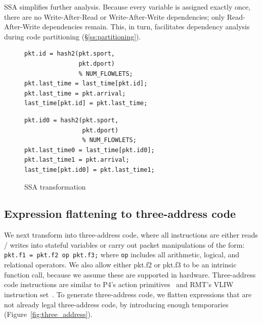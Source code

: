 SSA simplifies further analysis. Because every variable is assigned exactly
once, there are no Write-After-Read or Write-After-Write dependencies; only
Read-After-Write dependencies remain. This, in turn, facilitates dependency
analysis during code partitioning (\S\ref{ss:partitioning}).

\begin{figure}[!t]
  \begin{minipage}{0.48\textwidth}
  \begin{small}
  \begin{lstlisting}[style=customc]
pkt.id = hash2(pkt.sport,
               pkt.dport)
               % NUM_FLOWLETS;
pkt.last_time = last_time[pkt.id];
pkt.last_time = pkt.arrival;
last_time[pkt.id] = pkt.last_time;
  \end{lstlisting}
  \end{small}
  \end{minipage}
  \begin{minipage}{0.52\textwidth}
  \begin{small}
  \begin{lstlisting}[style=customc]
pkt.id0 = hash2(pkt.sport,
                pkt.dport)
                % NUM_FLOWLETS;
pkt.last_time0 = last_time[pkt.id0];
pkt.last_time1 = pkt.arrival;
last_time[pkt.id0] = pkt.last_time1;
  \end{lstlisting}
  \end{small}
  \end{minipage}
  \caption{SSA transformation}
\label{fig:ssa}
\end{figure}

\subsection{Expression flattening to three-address code}
We next transform into three-address code, where all instructions are either
reads / writes into stateful variables or carry out packet manipulations of the
form: \texttt{pkt.f1 = pkt.f2 op pkt.f3;} where \texttt{op} includes all
arithmetic, logical, and relational operators. We also allow either pkt.f2 or
pkt.f3 to be an intrinsic function call, because we assume these are supported
in hardware. Three-address code instructions are similar to P4's action
primitives~\cite{p4spec} and RMT's VLIW instruction set~\cite{rmt}. To generate
three-address code, we flatten expressions that are not already legal
three-address code, by introducing enough temporaries
(Figure~\ref{fig:three_address}).

